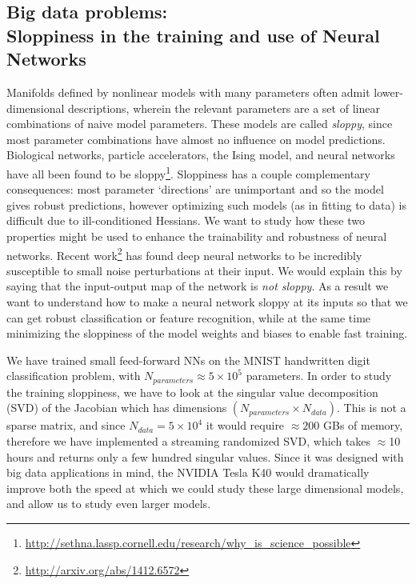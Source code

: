 \documentclass[12pt,pdf,singlespace]{article}
\begin{document}
\subsection*{Big data problems: \\Sloppiness in the training and use of Neural Networks}

Manifolds defined by nonlinear models with many parameters often admit lower-dimensional descriptions, wherein the relevant parameters are a set of linear combinations of naive model parameters. These models are called \emph{sloppy}, since most parameter combinations have almost no influence on model predictions. Biological networks, particle accelerators, the Ising model, and neural networks have all been found to be sloppy\footnote{\url{http://sethna.lassp.cornell.edu/research/why_is_science_possible}}. Sloppiness has a couple complementary consequences: most parameter `directions' are unimportant and so the model gives robust predictions, however optimizing such models (as in fitting to data) is difficult due to ill-conditioned Hessians. We want to study how these two properties might be used to enhance the trainability and robustness of neural networks. Recent work\footnote{\url{http://arxiv.org/abs/1412.6572}} has found deep neural networks to be incredibly susceptible to small noise perturbations at their input. We would explain this by saying that the input-output map of the network is \emph{ not sloppy}. As a result we want to understand how to make a neural network sloppy at its inputs so that we can get robust classification or feature recognition, while at the same time minimizing the sloppiness of the model weights and biases to enable fast training.

We have trained small feed-forward NNs on the MNIST handwritten digit classification problem, with $N_{parameters}\approx 5\times10^5$ parameters. In order to study the training sloppiness, we have to look at the singular value decomposition (SVD) of the Jacobian which has dimensions $(N_{parameters}\times N_{data})$. This is not a sparse matrix, and since $N_{data}=5\times10^4$ it would require $\approx 200$ GBs of memory, therefore we have implemented a streaming randomized SVD, which takes $\approx$10 hours and returns only a few hundred singular values. Since it was designed with big data applications in mind, the NVIDIA Tesla K40 would dramatically improve both the speed at which we could study these large dimensional models, and allow us to study even larger models.


\end{document}
